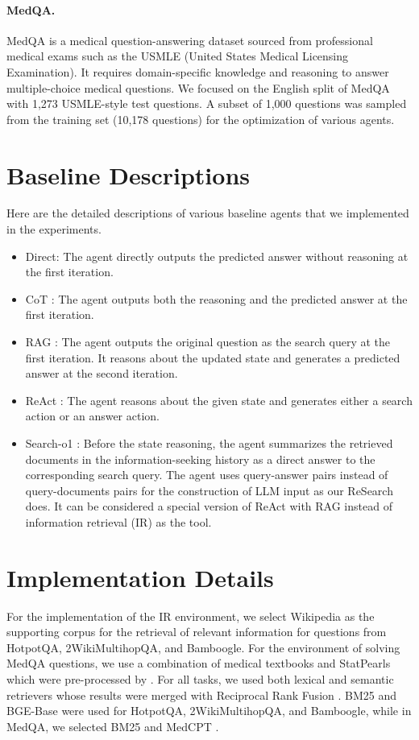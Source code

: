 \paragraph{MedQA.}
MedQA is a medical question-answering dataset sourced from professional medical exams such as the USMLE (United States Medical Licensing Examination). It requires domain-specific knowledge and reasoning to answer multiple-choice medical questions. We focused on the English split of MedQA with 1,273 USMLE-style test questions. A subset of 1,000 questions was sampled from the training set (10,178 questions) for the optimization of various agents.

\section{Baseline Descriptions} \label{sec:baseline_details}

Here are the detailed descriptions of various baseline agents that we implemented in the experiments.
\begin{itemize}
    \item Direct: The agent directly outputs the predicted answer without reasoning at the first iteration.
    \item CoT \citep{wei2022chain}: The agent outputs both the reasoning and the predicted answer at the first iteration.
    \item RAG \citep{lewis2020retrieval}: The agent outputs the original question as the search query at the first iteration. It reasons about the updated state and generates a predicted answer at the second iteration.
    \item ReAct \citep{yao2023react}: The agent reasons about the given state and generates either a search action or an answer action.
    \item Search-o1 \citep{li2025search}: Before the state reasoning, the agent summarizes the retrieved documents in the information-seeking history as a direct answer to the corresponding search query. The agent uses query-answer pairs instead of query-documents pairs for the construction of LLM input as our ReSearch does. It can be considered a special version of ReAct with RAG instead of information retrieval (IR) as the tool. 
\end{itemize}

\section{Implementation Details} \label{sec:implementation_details}
For the implementation of the IR environment, we select Wikipedia as the supporting corpus for the retrieval of relevant information for questions from HotpotQA, 2WikiMultihopQA, and Bamboogle. For the environment of solving MedQA questions, we use a combination of medical textbooks and StatPearls which were pre-processed by \citet{xiong2024benchmarking}. For all tasks, we used both lexical and semantic retrievers whose results were merged with Reciprocal Rank Fusion \citep{cormack2009reciprocal}. BM25 \citep{robertson2009probabilistic} and BGE-Base \citep{bge_embedding} were used for HotpotQA, 2WikiMultihopQA, and Bamboogle, while in MedQA, we selected BM25 and MedCPT \citep{jin2023medcpt}.

